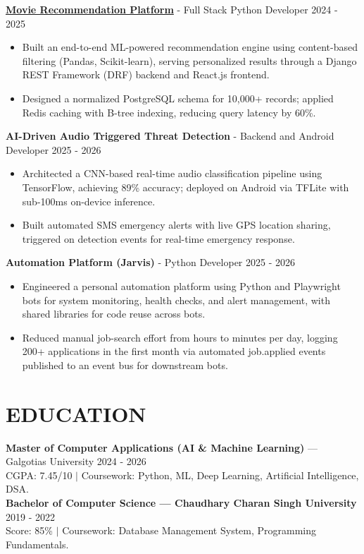 \documentclass[11pt,a4paper]{article}
\begin{document}
\href{https://github.com/venu0807/Recommendation_System}{\textbf{Movie Recommendation Platform}} - Full Stack Python Developer \hfill 2024 - 2025
\begin{itemize}[leftmargin=*, itemsep=1pt, topsep=1pt, parsep=0pt]
      \item Built an end-to-end ML-powered recommendation engine using content-based filtering (Pandas, Scikit-learn), serving personalized results through a Django REST Framework (DRF) backend and React.js frontend.
      \item Designed a normalized PostgreSQL schema for 10,000+ records; applied Redis caching with B-tree indexing, reducing query latency by 60\%.
\end{itemize}

\textbf{AI-Driven Audio Triggered Threat Detection} - Backend and Android Developer \hfill 2025 - 2026
\begin{itemize}[leftmargin=*, itemsep=1pt, topsep=1pt, parsep=0pt]
  \item Architected a CNN-based real-time audio classification pipeline using TensorFlow, achieving 89\% accuracy; deployed on Android via TFLite with sub-100ms on-device inference.
  \item Built automated SMS emergency alerts with live GPS location sharing, triggered on detection events for real-time emergency response.
\end{itemize}

\textbf{Automation Platform (Jarvis)} - Python Developer \hfill 2025 - 2026
\begin{itemize}[leftmargin=*, itemsep=0pt, topsep=1pt, parsep=0pt]
     \item Engineered a personal automation platform using Python and Playwright bots for system monitoring, health checks, and alert management, with shared libraries for code reuse across bots.
    \item Reduced manual job-search effort from hours to minutes per day, logging 200+ applications in the first month via automated job.applied events published to an event bus for downstream bots.
\end{itemize}

\section*{EDUCATION}
\textbf{Master of Computer Applications (AI \& Machine Learning)} --- Galgotias University \hfill 2024 - 2026 \\
CGPA: 7.45/10 \quad $|$ \quad Coursework: Python, ML, Deep Learning, Artificial Intelligence, DSA.
\\
\textbf{Bachelor of Computer Science --- Chaudhary Charan Singh University} \hfill 2019 - 2022 \\ Score: 85\% \; $|$ \; Coursework:  Database Management System, Programming Fundamentals. 
\end{document}
